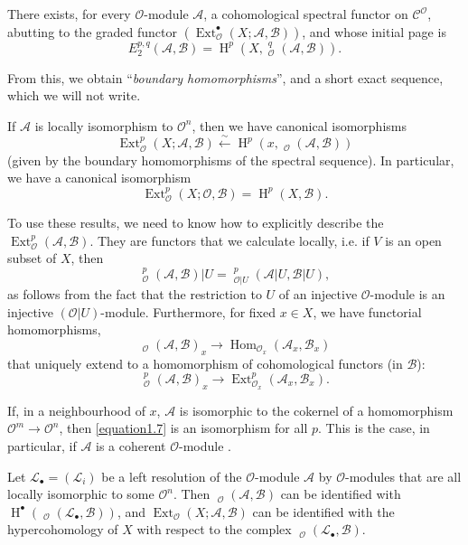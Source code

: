 \documentclass{article}
\theoremstyle{plain}
\newenvironment{proposition}[1]
    {\renewcommand\theinnercustomproposition{#1}\innercustomproposition}
    {\endinnercustomproposition}
\newenvironment{corollary}[1]
    {\renewcommand\theinnercustomcorollary{#1}\innercustomcorollary}
    {\endinnercustomcorollary}
\newcommand{\sh}{\mathscr}
\newcommand{\cat}{\mathcal}
\DeclareMathOperator{\Ext}{Ext}
\DeclareMathOperator{\Hom}{Hom}
\DeclareMathOperator{\shExt}{\underline{Ext}}
\DeclareMathOperator{\shHom}{\underline{Hom}}
\DeclareMathOperator{\HH}{H}
\newcommand{\oldpage}[1]{\marginpar{\footnotesize$\Big\vert$ \textit{p.~#1}}}
\begin{document}
\begin{proposition}{1}
\label{proposition1}
  There exists, for every $\sh{O}$-module $\sh{A}$, a cohomological spectral functor on $\cat{C}^\sh{O}$, abutting to the graded functor $(\Ext_\sh{O}^\bullet(X;\sh{A},\sh{B}))$, and whose initial page is
  \[
  \label{equation1.4}
    E_2^{p,q}(\sh{A},\sh{B}) = \HH^p(X,\shExt_\sh{O}^q(\sh{A},\sh{B})).
  \tag{1.4}
  \]
\end{proposition}

From this, we obtain ``\emph{boundary homomorphisms}'', and a short exact sequence, which we will not write.

\begin{corollary}{1}
\label{corollary1}
  If $\sh{A}$ is locally isomorphism to $\sh{O}^n$, then we have canonical isomorphisms
  \[
  \label{equation1.5}
    \Ext_\sh{O}^p(X;\sh{A},\sh{B}) \xleftarrow{\sim} \HH^p(x,\shHom_\sh{O}(\sh{A},\sh{B}))
  \tag{1.5}
  \]
  (given by the boundary homomorphisms of the spectral sequence).
  In particular, we have a canonical isomorphism
  \[
  \label{equation1.6}
    \Ext_\sh{O}^p(X;\sh{O},\sh{B}) = \HH^p(X,\sh{B}).
  \tag{1.6}
  \]
\end{corollary}

To use these results, we need to know how to explicitly describe the $\Ext_\sh{O}^p(\sh{A},\sh{B})$.
They are functors that we calculate locally, i.e. if $V$ is an open subset of $X$, then
\[
  \shExt_\sh{O}^p(\sh{A},\sh{B})|U = \shExt_{\sh{O}|U}^p(\sh{A}|U,\sh{B}|U),
\]
as follows from the fact that the restriction to $U$ of an injective $\sh{O}$-module is an injective $(\sh{O}|U)$-module.
Furthermore, for fixed $x\in X$, we have functorial homomorphisms,
\[
\label{equation1.7}
  \shHom_\sh{O}(\sh{A},\sh{B})_x \to \Hom_{\sh{O}_x}(\sh{A}_x,\sh{B}_x)
\tag{1.7}
\]
that uniquely extend to a homomorphism of cohomological functors (in $\sh{B}$):
\[
\label{equation1.8}
  \shExt_\sh{O}^p(\sh{A},\sh{B})_x \to \Ext_{\sh{O}_x}^p(\sh{A}_x,\sh{B}_x).
\tag{1.8}
\]

\begin{proposition}{2}
\label{proposition2}
  If, in a neighbourhood of $x$, $\sh{A}$ is isomorphic to the cokernel of a homomorphism $\sh{O}^m\to\sh{O}^n$, then \cref{equation1.7} is an isomorphism for all $p$.
  This is the case, in particular, if $\sh{A}$ is a coherent $\sh{O}$-module \cite{3}.
\end{proposition}

\oldpage{149-03}
\begin{proposition}{3}
\label{proposition3}
  Let $\sh{L}_\bullet=(\sh{L}_i)$ be a left resolution of the $\sh{O}$-module $\sh{A}$ by $\sh{O}$-modules that are all locally isomorphic to some $\sh{O}^n$.
  Then $\shExt_\sh{O}(\sh{A},\sh{B})$ can be identified with $\HH^\bullet(\shHom_\sh{O}(\sh{L}_\bullet,\sh{B}))$, and $\Ext_\sh{O}(X;\sh{A},\sh{B})$ can be identified with the hypercohomology of $X$ with respect to the complex $\shHom_\sh{O}(\sh{L}_\bullet,\sh{B})$.
\end{proposition}
\end{document}

